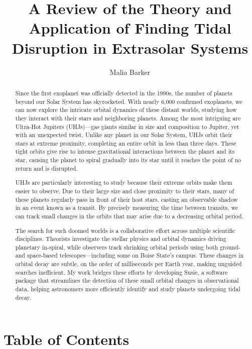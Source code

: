 \documentclass[oneside,12pt]{amsart}
\title[A Review of Tidal Disruption]{A Review of the Theory and Application of Finding Tidal Disruption in Extrasolar Systems}
\author{Malia Barker}
\let\origsection\section
\renewcommand{\section}[1]{\sectionmark{#1}\origsection{#1}}
\renewcommand\sectionmark[1]{\markboth{#1}{#1}}
\numberwithin{page}{section}
\begin{document}
\begin{abstract}
Since the first exoplanet was officially detected in the 1990s, the number of planets beyond our Solar System has skyrocketed. With nearly 6,000 confirmed exoplanets, we can now explore the intricate orbital dynamics of these distant worlds, studying how they interact with their stars and neighboring planets. Among the most intriguing are Ultra-Hot Jupiters (UHJs)—gas giants similar in size and composition to Jupiter, yet with an unexpected twist. Unlike any planet in our Solar System, UHJs orbit their stars at extreme proximity, completing an entire orbit in less than three days. These tight orbits give rise to intense gravitational interactions between the planet and its star, causing the planet to spiral gradually into its star until it reaches the point of no return and is disrupted. 

UHJs are particularly interesting to study because their extreme orbits make them easier to observe. Due to their large size and close proximity to their stars, many of these planets regularly pass in front of their host stars, casting an observable shadow in an event known as a transit. By precisely measuring the time between transits, we can track small changes in the orbits that may arise due to a decreasing orbital period.

The search for such doomed worlds is a collaborative effort across multiple scientific disciplines. Theorists investigate the stellar physics and orbital dynamics driving planetary in-spiral, while observers track shrinking orbital periods using both ground- and space-based telescopes—including some on Boise State’s campus. These changes in orbital decay are subtle, on the order of milliseconds per Earth year, making unguided searches inefficient. My work bridges these efforts by developing Susie, a software package that streamlines the detection of these small orbital changes in observational data, helping astronomers more efficiently identify and study planets undergoing tidal decay.
\end{abstract}

\maketitle

\clearpage

\section{Table of Contents}
\renewcommand\contentsname{}
\tableofcontents
\end{document}
